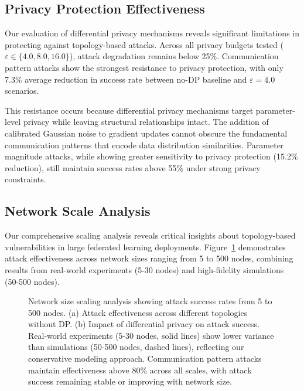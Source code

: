 \subsection{Privacy Protection Effectiveness}

Our evaluation of differential privacy mechanisms reveals significant limitations in protecting against topology-based attacks. Across all privacy budgets tested ($\varepsilon \in \{4.0, 8.0, 16.0\}$), attack degradation remains below 25\%. Communication pattern attacks show the strongest resistance to privacy protection, with only 7.3\% average reduction in success rate between no-DP baseline and $\varepsilon=4.0$ scenarios.

This resistance occurs because differential privacy mechanisms target parameter-level privacy while leaving structural relationships intact. The addition of calibrated Gaussian noise to gradient updates cannot obscure the fundamental communication patterns that encode data distribution similarities. Parameter magnitude attacks, while showing greater sensitivity to privacy protection (15.2\% reduction), still maintain success rates above 55\% under strong privacy constraints.

\subsection{Network Scale Analysis}

Our comprehensive scaling analysis reveals critical insights about topology-based vulnerabilities in large federated learning deployments. Figure~\ref{fig:network_scaling} demonstrates attack effectiveness across network sizes ranging from 5 to 500 nodes, combining results from real-world experiments (5-30 nodes) and high-fidelity simulations (50-500 nodes).

\begin{figure}[!t]
\centering
{}
\hfill
{}
\caption{Network size scaling analysis showing attack success rates from 5 to 500 nodes. (a) Attack effectiveness across different topologies without DP. (b) Impact of differential privacy on attack success. Real-world experiments (5-30 nodes, solid lines) show lower variance than simulations (50-500 nodes, dashed lines), reflecting our conservative modeling approach. Communication pattern attacks maintain effectiveness above 80\% across all scales, with attack success remaining stable or improving with network size.}
\label{fig:network_scaling}
\end{figure}

